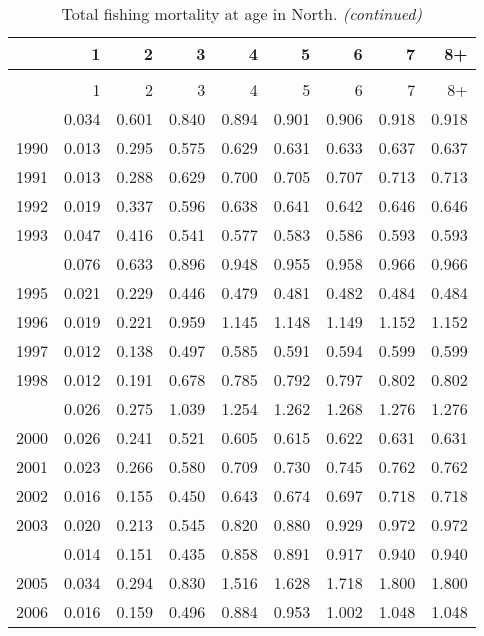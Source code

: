 \documentclass[
]{article}
\begin{document}
\begin{longtable}[t]{lrrrrrrrr}
\caption{\label{tab:North-region-FAA-table}Total fishing mortality at age in North.}\\
\toprule
  & 1 & 2 & 3 & 4 & 5 & 6 & 7 & 8+\\
\midrule
\endfirsthead
\caption[]{Total fishing mortality at age in North. \textit{(continued)}}\\
\toprule
  & 1 & 2 & 3 & 4 & 5 & 6 & 7 & 8+\\
\midrule
\endhead

\endfoot
\bottomrule
\endlastfoot
1989 & 0.034 & 0.601 & 0.840 & 0.894 & 0.901 & 0.906 & 0.918 & 0.918\\
1990 & 0.013 & 0.295 & 0.575 & 0.629 & 0.631 & 0.633 & 0.637 & 0.637\\
1991 & 0.013 & 0.288 & 0.629 & 0.700 & 0.705 & 0.707 & 0.713 & 0.713\\
1992 & 0.019 & 0.337 & 0.596 & 0.638 & 0.641 & 0.642 & 0.646 & 0.646\\
1993 & 0.047 & 0.416 & 0.541 & 0.577 & 0.583 & 0.586 & 0.593 & 0.593\\
\addlinespace
1994 & 0.076 & 0.633 & 0.896 & 0.948 & 0.955 & 0.958 & 0.966 & 0.966\\
1995 & 0.021 & 0.229 & 0.446 & 0.479 & 0.481 & 0.482 & 0.484 & 0.484\\
1996 & 0.019 & 0.221 & 0.959 & 1.145 & 1.148 & 1.149 & 1.152 & 1.152\\
1997 & 0.012 & 0.138 & 0.497 & 0.585 & 0.591 & 0.594 & 0.599 & 0.599\\
1998 & 0.012 & 0.191 & 0.678 & 0.785 & 0.792 & 0.797 & 0.802 & 0.802\\
\addlinespace
1999 & 0.026 & 0.275 & 1.039 & 1.254 & 1.262 & 1.268 & 1.276 & 1.276\\
2000 & 0.026 & 0.241 & 0.521 & 0.605 & 0.615 & 0.622 & 0.631 & 0.631\\
2001 & 0.023 & 0.266 & 0.580 & 0.709 & 0.730 & 0.745 & 0.762 & 0.762\\
2002 & 0.016 & 0.155 & 0.450 & 0.643 & 0.674 & 0.697 & 0.718 & 0.718\\
2003 & 0.020 & 0.213 & 0.545 & 0.820 & 0.880 & 0.929 & 0.972 & 0.972\\
\addlinespace
2004 & 0.014 & 0.151 & 0.435 & 0.858 & 0.891 & 0.917 & 0.940 & 0.940\\
2005 & 0.034 & 0.294 & 0.830 & 1.516 & 1.628 & 1.718 & 1.800 & 1.800\\
2006 & 0.016 & 0.159 & 0.496 & 0.884 & 0.953 & 1.002 & 1.048 & 1.048\\

\end{longtable}
\end{document}
